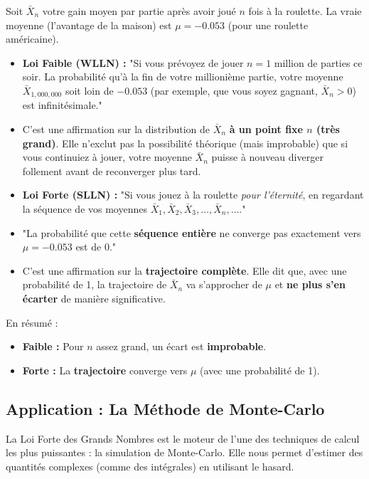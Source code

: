\begin{intuitionbox}
Soit $\bar{X}_n$ votre gain moyen par partie après avoir joué $n$ fois à la roulette. La vraie moyenne (l'avantage de la maison) est $\mu = -0.053$ (pour une roulette américaine).

\begin{itemize}
    \item \textbf{Loi Faible (WLLN) :} "Si vous prévoyez de jouer $n = 1 \text{ million}$ de parties ce soir. La probabilité qu'à la fin de votre millionième partie, votre moyenne $\bar{X}_{1,000,000}$ soit loin de $-0.053$ (par exemple, que vous soyez gagnant, $\bar{X}_n > 0$) est infinitésimale."
    \item C'est une affirmation sur la distribution de $\bar{X}_n$ \textbf{à un point fixe $n$ (très grand)}. Elle n'exclut pas la possibilité théorique (mais improbable) que si vous continuiez à jouer, votre moyenne $\bar{X}_n$ puisse à nouveau diverger follement avant de reconverger plus tard.

    \item \textbf{Loi Forte (SLLN) :} "Si vous jouez à la roulette \textit{pour l'éternité}, en regardant la séquence de vos moyennes $\bar{X}_1, \bar{X}_2, \bar{X}_3, \dots, \bar{X}_n, \dots$."
    \item "La probabilité que cette \textbf{séquence entière} ne converge pas exactement vers $\mu = -0.053$ est de 0."
    \item C'est une affirmation sur la \textbf{trajectoire complète}. Elle dit que, avec une probabilité de 1, la trajectoire de $\bar{X}_n$ va s'approcher de $\mu$ et \textbf{ne plus s'en écarter} de manière significative.
\end{itemize}

En résumé :
\begin{itemize}
    \item \textbf{Faible :} Pour $n$ assez grand, un écart est \textbf{improbable}.
    \item \textbf{Forte :} La \textbf{trajectoire} converge vers $\mu$ (avec une probabilité de 1).
\end{itemize}
\end{intuitionbox}

\subsection{Application : La Méthode de Monte-Carlo}

La Loi Forte des Grands Nombres est le moteur de l'une des techniques de calcul les plus puissantes : la simulation de Monte-Carlo. Elle nous permet d'estimer des quantités complexes (comme des intégrales) en utilisant le hasard.

